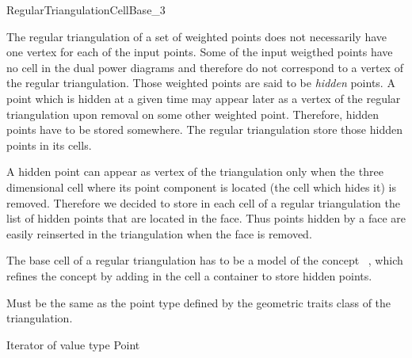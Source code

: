 

\begin{ccRefConcept}{RegularTriangulationCellBase_3}


\ccDefinition
  
The regular triangulation of a set of weighted points does not
necessarily
have one vertex for each of the input points. Some of the input
weigthed points have no cell in the dual power diagrams
and therefore do not correspond to a vertex of the regular
triangulation.
Those weighted points are said to be {\it hidden} points.
A  point which is hidden at a given time may appear later as a vertex of
the regular triangulation upon removal on some other weighted point.
Therefore, hidden points have to be stored somewhere.
The regular triangulation store those hidden points
in its cells.

A hidden point can appear as vertex of the triangulation
only when the
three dimensional cell where its point component is located
(the cell which hides it)
is removed. Therefore we decided to store 
in each cell of a regular triangulation
the list of hidden points that are located in the face.
Thus  points hidden by a face are easily reinserted in the triangulation
when the face is removed.

The base cell of a regular triangulation 
has to be a model
of the concept \ccRefName\ , which refines
the concept  by adding
in the cell  a container to store hidden points.

\ccRefines
{}

\ccTypes
{}
{Must be the same as the point type 
defined by the geometric traits class of the triangulation.}

\ccTypes
{}
{Iterator of value type Point}





\end{ccRefConcept}
